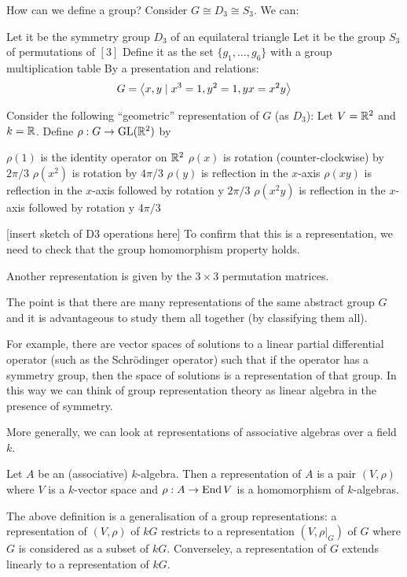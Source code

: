 \begin{exam}
	How can we define a group?
	Consider $G \cong D_3 \cong S_3$.
	We can:
	\begin{itm}
		\io Let it be the symmetry group $D_3$ of an equilateral triangle
		\io Let it be the group $S_3$ of permutations of $[3]$
		\io Define it as the set $\{g_1,\ldots,g_6\}$ with a group multiplication table
		\io By a presentation and relations:
		\[G=\left\langle x,y \mid x^3=1, y^2=1, yx=x^2y \right\rangle\]
	\end{itm}
	
	Consider the following ``geometric'' representation of $G$ (as $D_3$):
	Let $V=\mathbb{R}^2$ and $k=\mathbb{R}$.
	Define $\rho:G \to \operatorname{GL}(\mathbb{R}^2)$ by
	\begin{itm}
		\io $\rho(1)$ is the identity operator on $\mathbb{R}^2$
		\io $\rho(x)$ is rotation (counter-clockwise) by $2\pi/3$
		\io $\rho(x^2)$ is rotation by $4\pi/3$
		\io $\rho(y)$ is reflection in the $x$-axis
		\io $\rho(xy)$ is reflection in the $x$-axis followed by rotation y $2\pi/3$
		\io $\rho(x^2y)$ is reflection in the $x$-axis followed by rotation y $4\pi/3$
	\end{itm}
	[insert sketch of D3 operations here]
	To confirm that this is a representation, we need to check that the group homomorphism property holds.
	
	Another representation is given by the $3 \times 3$ permutation matrices.
	
	The point is that there are many representations of the same abstract group $G$ and it is advantageous to study them all together (by classifying them all).
	
	For example, there are vector spaces of solutions to a linear partial differential operator (such as the Schr\"odinger operator) such that if the operator has a symmetry group, then the space of solutions is a representation of that group.
	In this way we can think of group representation theory as linear algebra in the presence of symmetry.
\end{exam}

More generally, we can look at representations of associative algebras over a field $k$.

\begin{defn}
	Let $A$ be an (associative) $k$-algebra.
	Then a representation of $A$ is a pair $(V,\rho)$ where $V$ is a $k$-vector space and $\rho:A \to \operatorname{End} V$ is a homomorphism of $k$-algebras.
\end{defn}

\begin{rmk}
	The above definition is a generalisation of a group representations: a representation of $(V,\rho)$ of $kG$ restricts to a representation $(V,\rho|_G)$ of $G$ where $G$ is considered as a subset of $kG$.
	Converseley, a representation of $G$ extends linearly to a representation of $kG$.
\end{rmk}
